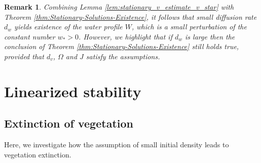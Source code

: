 \documentclass[11pt, a4paper]{article}
\theoremstyle{break}
\theoremstyle{break}
\theoremstyle{break}
\theoremstyle{break}
\newtheorem{rem}{Remark}[section]
\theoremstyle{break}
\theoremstyle{break}
\theoremstyle{break}
\begin{document}
\begin{rem}
    Combining Lemma \ref{lem:stationary_v_estimate_v_star} with Theorem \ref{thm:Stationary-Solutions-Existence}, it follows that small diffusion rate $d_w$ yields existence of the water profile $W$, which is a small perturbation of the constant number $w_* > 0$. However, we highlight that if $d_w$ is large then the conclusion of Theorem \ref{thm:Stationary-Solutions-Existence} still holds true, provided that $d_v$, $\Omega$ and $J$ satisfy the assumptions.
\end{rem}

\section{Linearized stability}

\subsection{Extinction of vegetation} Here, we investigate how the assumption of small initial density leads to vegetation extinction.
\end{document}
